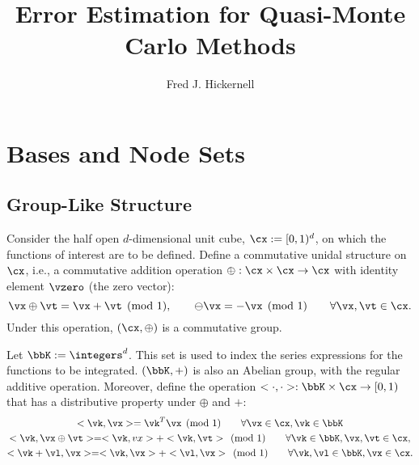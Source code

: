 \documentclass[]{elsarticle}
\theoremstyle{definition}
\theoremstyle{remark}
\begin{document}
\begin{frontmatter}

\title{Error Estimation for Quasi-Monte Carlo Methods}
\author{Fred J. Hickernell}
\address{Room E1-208, Department of Applied Mathematics, Illinois Institute of Technology,\\ 10 W.\ 32$^{\text{nd}}$ St., Chicago, IL 60616}
\begin{abstract}
\end{abstract}

\begin{keyword}


\end{keyword}
\end{frontmatter}

\section{Bases and Node Sets}

\subsection{Group-Like Structure}
Consider the half open $d$-dimensional unit cube, $\cx:=[0,1)^d$, on which the functions of interest are to be defined. Define a commutative unidal structure on $\cx$, i.e., a commutative addition operation $\oplus:\cx \times \cx \to \cx$ with identity element $\vzero$ (the zero vector):
\[
\vx \oplus \vt = \vx + \vt \pmod 1, \qquad \ominus \vx = -\vx \pmod 1 \qquad \forall \vx, \vt \in \cx.
\]
Under this operation, $(\cx,\oplus)$ is a commutative group.

Let $\bbK:=\integers^d$. This set is used to index the series expressions for the functions to be integrated.  $(\bbK,+)$ is also an Abelian group, with the regular additive operation.  Moreover, define the operation $<\cdot,\cdot>: \bbK \times \cx \to [0,1)$ that has a distributive property under $\oplus$ and $+$:
\begin{subequations} \label{distrib}
\begin{gather}
<\vk,\vx> = \vk^T \vx \pmod 1 \qquad \forall \vx \in \cx, \vk \in \bbK \\
<\vk,\vx \oplus \vt> = <\vk,vx> + <\vk,\vt> \pmod 1 \qquad \forall \vk \in \bbK, \vx, \vt \in \cx, \\
<\vk + \vl,\vx> = <\vk,\vx> + <\vl,\vx> \pmod 1 \qquad \forall \vk,\vl \in \bbK, \vx \in \cx.
\end{gather}
\end{subequations}
\end{document}
